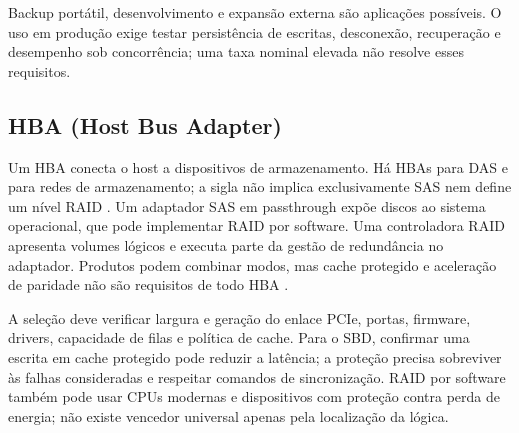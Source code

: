 \documentclass[titlepage]{article}
\begin{document}
Backup portátil, desenvolvimento e expansão externa são aplicações possíveis. O uso em produção exige testar persistência de escritas, desconexão, recuperação e desempenho sob concorrência; uma taxa nominal elevada não resolve esses requisitos.

\subsection{HBA (Host Bus Adapter)}
Um HBA conecta o host a dispositivos de armazenamento. Há HBAs para DAS e para redes de armazenamento; a sigla não implica exclusivamente SAS nem define um nível RAID \cite{snia_dictionary}. Um adaptador SAS em passthrough expõe discos ao sistema operacional, que pode implementar RAID por software. Uma controladora RAID apresenta volumes lógicos e executa parte da gestão de redundância no adaptador. Produtos podem combinar modos, mas cache protegido e aceleração de paridade não são requisitos de todo HBA \cite{microchip_storage}.

A seleção deve verificar largura e geração do enlace PCIe, portas, firmware, drivers, capacidade de filas e política de cache. Para o SBD, confirmar uma escrita em cache protegido pode reduzir a latência; a proteção precisa sobreviver às falhas consideradas e respeitar comandos de sincronização. RAID por software também pode usar CPUs modernas e dispositivos com proteção contra perda de energia; não existe vencedor universal apenas pela localização da lógica.
\end{document}
